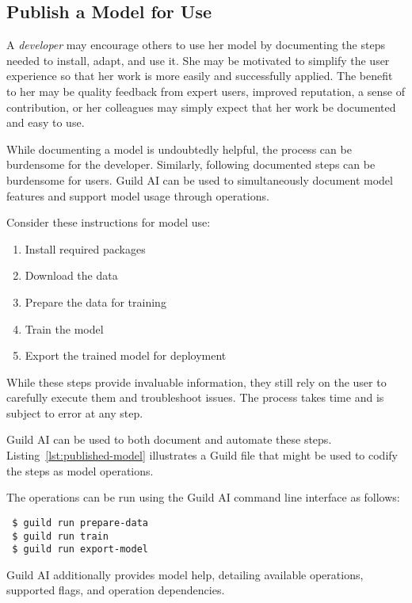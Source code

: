 \documentclass{article}
\begin{document}
\subsection{Publish a Model for Use}
\label{sec:publish-model}

A \emph{developer} may encourage others to use her model by
documenting the steps needed to install, adapt, and use it. She may be
motivated to simplify the user experience so that her work is more
easily and successfully applied. The benefit to her may be quality
feedback from expert users, improved reputation, a sense of
contribution, or her colleagues may simply expect that her work be
documented and easy to use.

While documenting a model is undoubtedly helpful, the process can be
burdensome for the developer. Similarly, following documented steps
can be burdensome for users. Guild AI can be used to simultaneously
document model features and support model usage through operations.

Consider these instructions for model use:

\setlength{\parindent}{1em}
\begin{enumerate}
\item Install required packages
\item Download the data
\item Prepare the data for training
\item Train the model
\item Export the trained model for deployment
\end{enumerate}
\setlength{\parindent}{0em}

While these steps provide invaluable information, they still rely on
the user to carefully execute them and troubleshoot issues. The
process takes time and is subject to error at any step.

Guild AI can be used to both document and automate these
steps. Listing~\ref{lst:published-model} illustrates a Guild file that
might be used to codify the steps as model operations.

The operations can be run using the Guild AI command line interface as
follows:

{\footnotesize
\begin{verbatim}
 $ guild run prepare-data
 $ guild run train
 $ guild run export-model
\end{verbatim}}

Guild AI additionally provides model help, detailing available
operations, supported flags, and operation dependencies.
\end{document}

